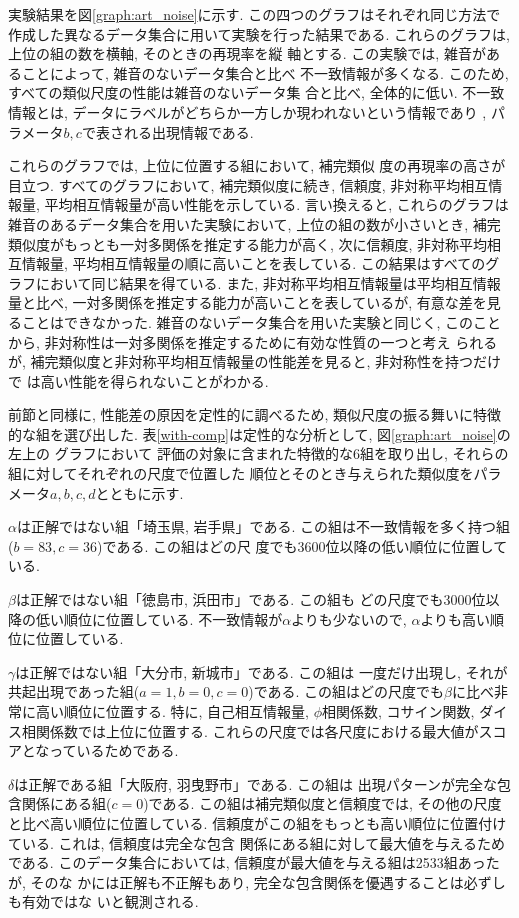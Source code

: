 実験結果を図\ref{graph:art_noise}に示す. 
この四つのグラフはそれぞれ同じ方法で作成した異なるデータ集合に用いて実験を行った結果である. 
これらのグラフは, 上位の組の数を横軸, そのときの再現率を縦
軸とする. 
この実験では, 雑音があることによって, 雑音のないデータ集合と比べ
不一致情報が多くなる. このため, すべての類似尺度の性能は雑音のないデータ集
合と比べ, 全体的に低い. 
不一致情報とは, データにラベルがどちらか一方しか現われないという情報であり
, パラメータ$b,c$で表される出現情報である. 

これらのグラフでは, 上位に位置する組において, 補完類似
度の再現率の高さが目立つ. 
すべてのグラフにおいて, 補完類似度に続き, 
信頼度, 非対称平均相互情報量, 平均相互情報量が高い性能を示している. 
言い換えると, これらのグラフは雑音のあるデータ集合を用いた実験において, 
上位の組の数が小さいとき, 補完類似度がもっとも一対多関係を推定する能力が高く, 
次に信頼度, 非対称平均相互情報量, 平均相互情報量の順に高いことを表している. 
この結果はすべてのグラフにおいて同じ結果を得ている. 
また, 非対称平均相互情報量は平均相互情報量と比べ, 
一対多関係を推定する能力が高いことを表しているが, 
有意な差を見ることはできなかった. 
雑音のないデータ集合を用いた実験と同じく, 
このことから, 非対称性は一対多関係を推定するために有効な性質の一つと考え
られるが, 補完類似度と非対称平均相互情報量の性能差を見ると, 非対称性を持つだけで
は高い性能を得られないことがわかる. 

前節と同様に, 性能差の原因を定性的に調べるため, 類似尺度の振る舞いに特徴的な組を選び出した. 
表\ref{with-comp}は定性的な分析として, 図\ref{graph:art_noise}の左上の
グラフにおいて
評価の対象に含まれた特徴的な6組を取り出し, それらの組に対してそれぞれの尺度で位置した
順位とそのとき与えられた類似度をパラメータ$a,b,c,d$とともに示す. 

$\alpha$は正解ではない組「埼玉県, 岩手県」である. 
この組は不一致情報を多く持つ組($b=83,c=36$)である. この組はどの尺
度でも3600位以降の低い順位に位置している. 

$\beta$は正解ではない組「徳島市, 浜田市」である. この組も
どの尺度でも3000位以降の低い順位に位置している. 
不一致情報が$\alpha$よりも少ないので, $\alpha$よりも高い順位に位置している. 

$\gamma$は正解ではない組「大分市, 新城市」である. この組は
一度だけ出現し, それが共起出現であった組($a=1,b=0,c=0$)である. 
この組はどの尺度でも$\beta$に比べ非常に高い順位に位置する. 
特に, 自己相互情報量, $\phi$相関係数, コサイン関数, ダイス相関係数では上位に位置する. 
これらの尺度では各尺度における最大値がスコアとなっているためである. 

$\delta$は正解である組「大阪府, 羽曳野市」である. この組は
出現パターンが完全な包含関係にある組($c=0$)である. 
この組は補完類似度と信頼度では, その他の尺度と比べ高い順位に位置している. 
信頼度がこの組をもっとも高い順位に位置付けている. これは, 信頼度は完全な包含
関係にある組に対して最大値を与えるためである. 
このデータ集合においては, 信頼度が最大値を与える組は2533組あったが, そのな
かには正解も不正解もあり, 完全な包含関係を優遇することは必ずしも有効ではな
いと観測される. 

